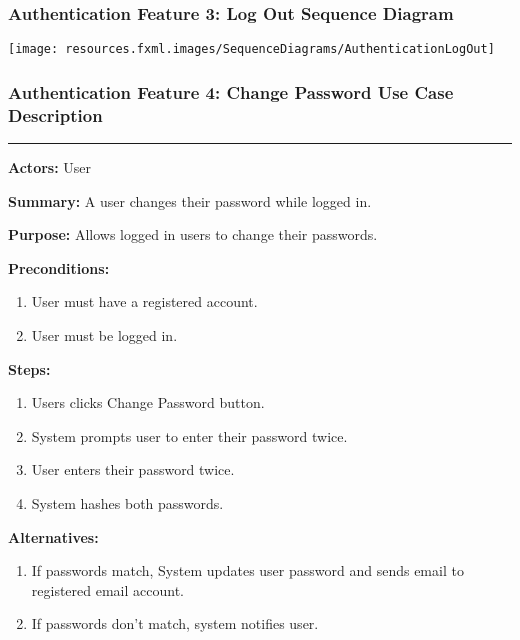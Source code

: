 \documentclass[twoside,letterpaper]{article}
\begin{document}
\subsubsection[Authentication Feature 3: Log Out Sequence Diagram]{\rmfamily\bfseries\color{black}
	Authentication Feature 3: Log Out Sequence Diagram}
	\label{a:sd3}
\hypertarget{RefHeading22059017292}{}

\bigskip

\texttt{[image: resources.fxml.images/SequenceDiagrams/AuthenticationLogOut]}

\newpage

\subsubsection[Authentication Feature 4: Change Password Use Case Description]{\rmfamily\bfseries\color{black}
	Authentication Feature 4: Change Password Use Case Description}
	\label{a:uc4}
\hypertarget{RefHeading22059017292}{}

\hrule
\vspace{8pt}
\noindent\textbf{Actors:} User \newline

\noindent\textbf{Summary:} A user changes their password while logged in.  \newline

\noindent\textbf{Purpose:} Allows logged in users to change their passwords.  \newline

\noindent\textbf{Preconditions:}
\begin{enumerate}
	\item User must have a registered account.
	\item User must be logged in.
\end{enumerate}

\noindent\textbf{Steps:}
\begin{enumerate}
	\item Users clicks Change Password button.
	\item System prompts user to enter their password twice.
	\item User enters their password twice.
	\item System hashes both passwords.
\end{enumerate}

\noindent\textbf{Alternatives:}
\begin{enumerate}
	\item If passwords match, System updates user password and sends email to registered email account.
	\item If passwords don't match, system notifies user.
\end{enumerate}
\end{document}

